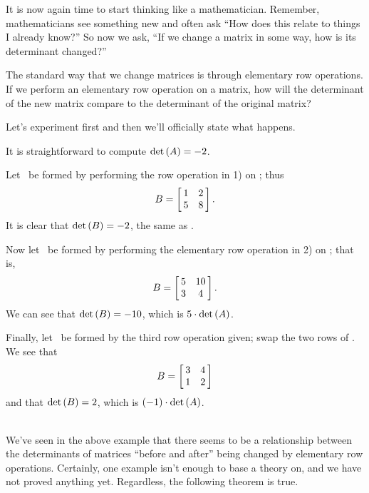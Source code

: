 It is now again time to start thinking like a mathematician. Remember, mathematicians see something new and often ask ``How does this relate to things I already know?'' So now we ask, ``If we change a matrix in some way, how is its determinant changed?''

The standard way that we change matrices is through elementary row operations. If we perform an elementary row operation on a matrix, how will the determinant of the new matrix compare to the determinant of the original matrix?

Let's experiment first and then we'll officially state what happens. \\

{%
It is straightforward to compute $\det{\tta} = -2$.

Let \ttb\ be formed by performing the row operation in 1) on \tta; thus $$\ttb = \bmx{cc} 1&2\\5&8\emx.$$  It is clear that $\det{\ttb} = -2$, the same as \det{\tta}.

Now let \ttb\ be formed by performing the elementary row operation in 2) on \tta; that is, $$\ttb = \bmx{cc}5&10\\3&4\emx.$$ We can see that $\det{\ttb} = -10$, which is $5\cdot\det{\tta}$.

Finally, let \ttb\ be formed by the third row operation given; swap the two rows of \tta. We see that $$\ttb = \bmx{cc}3&4\\1&2\emx$$ and that $\det{\ttb} = 2$, which is $(-1)\cdot\det{\tta}$.} \\ %

We've seen in the above example that there seems to be a relationship between the determinants of matrices ``before and after'' being changed by elementary row operations. Certainly, one example isn't enough to base a theory on, and we have not proved anything yet. Regardless, the following theorem is true.

